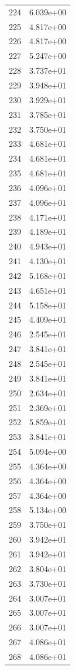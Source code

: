 \documentclass[12pt]{article}
\begin{document}
\begin{longtable}{@{}cc@{}}
224 & 6.039e+00 \\
225 & 4.817e+00 \\
226 & 4.817e+00 \\
227 & 5.247e+00 \\
228 & 3.737e+01 \\
229 & 3.948e+01 \\
230 & 3.929e+01 \\
231 & 3.785e+01 \\
232 & 3.750e+01 \\
233 & 4.681e+01 \\
234 & 4.681e+01 \\
235 & 4.681e+01 \\
236 & 4.096e+01 \\
237 & 4.096e+01 \\
238 & 4.171e+01 \\
239 & 4.189e+01 \\
240 & 4.943e+01 \\
241 & 4.130e+01 \\
242 & 5.168e+01 \\
243 & 4.651e+01 \\
244 & 5.158e+01 \\
245 & 4.409e+01 \\
246 & 2.545e+01 \\
247 & 3.841e+01 \\
248 & 2.545e+01 \\
249 & 3.841e+01 \\
250 & 2.634e+01 \\
251 & 2.369e+01 \\
252 & 5.859e+01 \\
253 & 3.841e+01 \\
254 & 5.094e+00 \\
255 & 4.364e+00 \\
256 & 4.364e+00 \\
257 & 4.364e+00 \\
258 & 5.134e+00 \\
259 & 3.750e+01 \\
260 & 3.942e+01 \\
261 & 3.942e+01 \\
262 & 3.804e+01 \\
263 & 3.730e+01 \\
264 & 3.007e+01 \\
265 & 3.007e+01 \\
266 & 3.007e+01 \\
267 & 4.086e+01 \\
268 & 4.086e+01 \\

\end{longtable}
\end{document}
